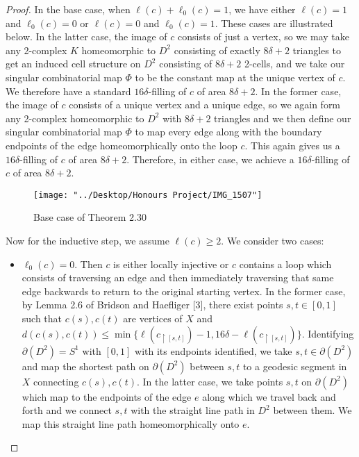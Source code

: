 \documentclass[12pt]{article}
\newcommand{\vs}{\vskip10pt}
\begin{document}
\begin{proof}
		In the base case, when $\ell(c) + \ell_0(c) = 1$, we have either $\ell(c) = 1$ and $\ell_0(c) = 0$ or $\ell(c) = 0$ and $\ell_0(c) = 1$. These cases are illustrated below. In the latter case, the image of $c$ consists of just a vertex, so we may take any 2-complex $K$ homeomorphic to $D^2$ consisting of exactly $8 \delta + 2$ triangles to get an induced cell structure on $D^2$ consisting of $8 \delta + 2$ 2-cells, and we take our singular combinatorial map $\Phi$ to be the constant map at the unique vertex of $c$. We therefore have a standard $16 \delta$-filling of $c$ of area $8 \delta + 2$. In the former case, the image of $c$ consists of a unique vertex and a unique edge, so we again form any 2-complex homeomorphic to $D^2$ with $8 \delta + 2$ triangles and we then define our singular combinatorial map $\Phi$ to map every edge along with the boundary endpoints of the edge homeomorphically onto the loop $c$. This again gives us a $16 \delta$-filling of $c$ of area $8 \delta + 2$. Therefore, in either case, we achieve a $16 \delta$-filling of $c$ of area $8 \delta + 2$. 
		
\begin{figure} [H]
	\centering
	\texttt{[image: "../Desktop/Honours Project/IMG\_1507"]}
	\caption{Base case of Theorem 2.30}
	\label{fig:img1507}
\end{figure}
		\vs 
		
		Now for the inductive step, we assume $\ell(c) \geq 2$. We consider two cases: 
		
		\begin{itemize}
			\item $\ell_0(c) = 0$. Then $c$ is either locally injective or $c$ contains a loop which consists of traversing an edge and then immediately traversing that same edge backwards to return to the original starting vertex. In the former case, by Lemma 2.6 of Bridson and Haefliger [3], there exist points $s,t \in [0,1]$ such that $c(s), c(t)$ are vertices of $X$ and $d(c(s), c(t)) \leq \min \{\ell(c_{\restriction [s,t]}) - 1, 16 \delta - \ell(c_{\restriction [s,t]})\}$. Identifying $\partial (D^2) = S^1$ with $[0,1]$ with its endpoints identified, we take $s,t \in \partial(D^2)$ and map the shortest path on $\partial(D^2)$ between $s,t$ to a geodesic segment in $X$ connecting $c(s), c(t)$. In the latter case, we take points $s,t$ on $\partial(D^2)$ which map to the endpoints of the edge $e$ along which we travel back and forth and we connect $s,t$ with the straight line path in $D^2$ between them. We map this straight line path homeomorphically onto $e$. 
			

\end{itemize}
\end{proof}
\end{document}
